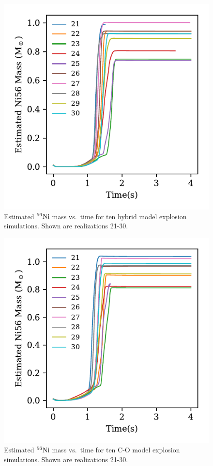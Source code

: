 \documentclass[iop,apj]{emulateapj}
\newcommand{\Ni}[1]{\ensuremath{{}^{#1}{\rm Ni}}}
\begin{document}
\begin{figure}
\includegraphics[width=\columnwidth]{figures/Hybrid_Ni56mass_v_time_plot.pdf}
\caption{\label{fig:nithybrid}
Estimated \Ni{56} mass vs.\ time for ten hybrid model explosion simulations.
Shown are realizations 21-30.
}
\end{figure}
\begin{figure}
\includegraphics[width=\columnwidth]{figures/CO_Ni56mass_v_time_plot.pdf}
\caption{\label{fig:nitco}
Estimated \Ni{56} mass vs.\ time for ten C-O model explosion simulations.
Shown are realizations 21-30.
}
\end{figure}
\end{document}
